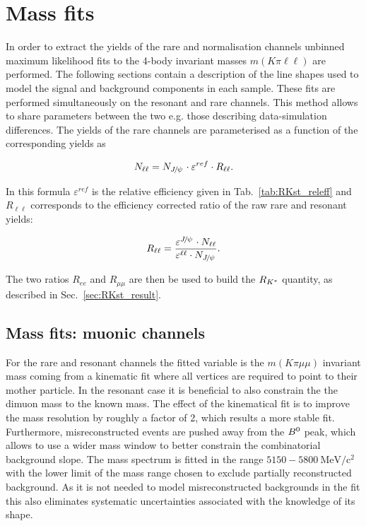 \chapter{Mass fits}
\label{sec:rkst_fits}

In order to extract the yields of the rare and normalisation channels unbinned maximum likelihood fits
to the 4-body invariant masses $m(K\pi\ell\ell)$ are performed.
The following sections contain a description of the line shapes used to model the signal and background
components in each sample.
These fits are performed simultaneously on the resonant and rare channels.
This method allows to share parameters between the two e.g. those describing data-simulation differences.
The yields of the rare channels are parameterised as a function of the corresponding \jpsi yields as

\begin{equation}
N_{\ell\ell} = N_{\jpsi} \cdot \varepsilon^{ref} \cdot R_{\ell\ell}.
\end{equation}

In this formula $\varepsilon^{ref}$ is the relative efficiency given in Tab.~\ref{tab:RKst_releff} and
$R_{\ell\ell}$ corresponds to the efficiency corrected ratio of the raw rare and resonant yields:

\begin{equation}
R_{\ell\ell} = \frac{\varepsilon^{\jpsi} \cdot N_{\ell\ell}}{\varepsilon^{\ell\ell} \cdot N_{\jpsi}}.
\end{equation}

The two ratios $R_{ee}$ and $R_{\mu\mu}$ are then be used to build
the $R_{{{K}^*}}$ quantity, as described in Sec.~\ref{sec:RKst_result}.


\section{Mass fits: muonic channels}

For the rare and resonant \mumu channels the fitted variable is the $m(K\pi \mu\mu)$ invariant mass coming
from a kinematic fit where all vertices are required to point to their mother particle.
In the resonant case it is beneficial to also constrain the the dimuon mass to the known \jpsi mass.
The effect of the kinematical fit is to improve the mass resolution by roughly a factor of 2, which results
a more stable fit. Furthermore, misreconstructed events are pushed away from the ${{B}^0}$ peak, which allows to
use a wider mass window to better constrain the combinatorial background slope.
The mass spectrum is fitted in the range $5150 - 5800 ~\mbox{MeV/c}{^2}$ with the lower limit
of the mass range chosen to exclude partially reconstructed background.
As it is not needed to model misreconstructed backgrounds in the fit this also
eliminates systematic uncertainties associated with the knowledge of its shape. 

